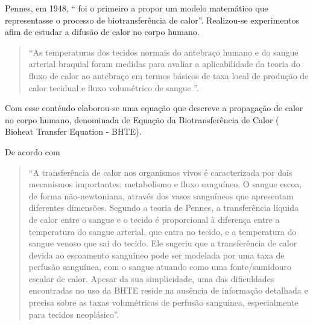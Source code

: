      Pennes, em 1948, `` foi o primeiro a propor um modelo matemático que representasse o processo de biotransferência de calor''\cite[p.28]{Marcus}.
     Realizou-se experimentos afim de estudar a difusão de calor no corpo humano.
      
      \begin{quotation}
     ``As temperaturas dos tecidos normais do antebraço humano e do sangue arterial braquial foram medidas para avaliar a aplicabilidade da teoria do fluxo de calor ao antebraço em termos básicos de taxa local de produção de calor tecidual e fluxo volumétrico de sangue ''\cite{PENNES}. \end{quotation}

   Com esse contéudo elaborou-se uma equação que descreve a propagação de calor no corpo humano, denominada de Equação da Biotransferência de Calor ( Bioheat Transfer Equation - BHTE).


      De acordo com 
 \begin{quotation} ``A transferência de calor nos organismos vivos é caracterizada por dois mecanismos importantes: metabolismo e fluxo sanguíneo. O sangue escoa, de forma não-newtoniana, através dos vasos sanguíneos que apresentam diferentes dimensões. Segundo a teoria de Pennes, a transferência líquida de calor entre o sangue e o tecido é proporcional à diferença entre a temperatura do sangue arterial, que entra no tecido, e a temperatura do sangue venoso que sai do tecido. Ele sugeriu que a transferência de calor devida ao escoamento sanguíneo pode ser modelada por uma taxa de perfusão sanguínea, com o sangue atuando como uma fonte/sumidouro escalar de calor. Apesar da sua simplicidade, uma das dificuldades encontradas no uso da BHTE reside na ausência de informação detalhada e precisa sobre as taxas volumétricas de perfusão sanguínea, especialmente para tecidos neoplásico''\cite{Olho}.\end{quotation}

